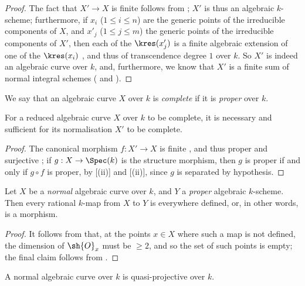 \begin{proof}
The fact that $X'\to X$ is finite follows from ;
$X'$ is thus an algebraic $k$-scheme;
furthermore, if $x_i$ ($1\leq i\leq n$) are the generic points of the irreducible components of $X$, and $x'_j$ ($1\leq j\leq m$) the generic points of the irreducible components of $X'$, then each of the $\kres(x'_j)$ is a finite algebraic extension of one of the $\kres(x_i)$ , and thus of transcendence degree $1$ over $k$.
So $X'$ is indeed an algebraic curve over $k$, and, furthermore, we know that $X'$ is a finite sum of normal integral schemes ( and ).
\end{proof}

\begin{env}[7.4.7]
\label{II.7.4.7}
We say that an algebraic curve $X$ over $k$ is \emph{complete} if it is \emph{proper} over $k$.
\end{env}

\begin{corollary}[7.4.8]
\label{II.7.4.8}
For a reduced algebraic curve $X$ over $k$ to be complete, it is necessary and sufficient for its normalisation $X'$ to be complete.
\end{corollary}

\begin{proof}
The canonical morphism $f:X'\to X$ is finite , and thus proper  and surjective ;
if $g:X\to\Spec(k)$ is the structure morphism, then $g$ is proper if and only if $g\circ f$ is proper, by [(ii)] and [(ii)], since $g$ is separated by hypothesis.
\end{proof}

\begin{proposition}[7.4.9]
\label{II.7.4.9}
Let $X$ be a \emph{normal} algebraic curve over $k$, and $Y$ a \emph{proper} algebraic $k$-scheme.
Then every rational $k$-map from $X$ to $Y$ is everywhere defined, or, in other words, is a morphism.
\end{proposition}

\begin{proof}
It follows from  that, at the points $x\in X$ where such a map is not defined, the dimension of $\sh{O}_x$ must be $\geq2$, and so the set of such points is empty;
the final claim follows from .
\end{proof}

\begin{corollary}[7.4.10]
\label{II.7.4.10}
A normal algebraic curve over $k$ is quasi-projective over $k$.
\end{corollary}

